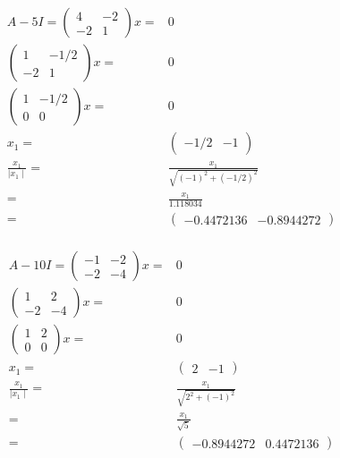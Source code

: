 \documentclass[a4paper,10pt]{article}
\begin{document}
 \begin{align*}
  A - 5 I =  \begin{pmatrix} 4 & -2 \\ -2 & 1 \end{pmatrix} x = & 0\\
  \begin{pmatrix} 1 & -1/2 \\ -2 & 1 \end{pmatrix} x = & 0\\
  \begin{pmatrix} 1 & -1/2 \\ 0 & 0 \end{pmatrix} x = & 0\\
  x_1 = & \begin{pmatrix} -1/2 & -1 \end{pmatrix} \\
  \frac{x_1}{\mid x_1 \mid }  = & \frac{x_1}{ \sqrt{(-1)^2 + (-1/2)^2 } }\\
  = & \frac{x_1}{1.118034} \\
  = & \begin{pmatrix}  -0.4472136 & - 0.8944272 \end{pmatrix}\\
 \end{align*}

  \begin{align*}
  A - 10 I =  \begin{pmatrix} -1 & -2 \\ -2 & -4 \end{pmatrix} x = & 0\\
  \begin{pmatrix} 1 & 2 \\ -2 & -4 \end{pmatrix} x = & 0\\
  \begin{pmatrix} 1 & 2 \\ 0 & 0 \end{pmatrix} x = & 0\\
  x_1 = & \begin{pmatrix} 2 & -1 \end{pmatrix} \\
  \frac{x_1}{\mid x_1 \mid }  = & \frac{x_1}{ \sqrt{2^2 + (-1)^2 } }\\
  = & \frac{x_1}{\sqrt{5}} \\
  = & \begin{pmatrix}  - 0.8944272 & 0.4472136 \end{pmatrix}\\
 \end{align*}
 
\end{document}

